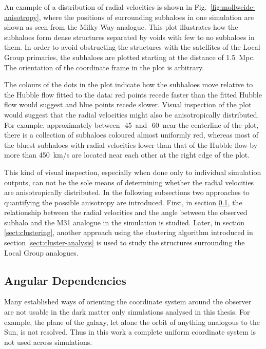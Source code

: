 \documentclass[english, oneside]{HYgradu}
\begin{document}
An example of a distribution of radial velocities is shown in Fig.~\ref{fig:mollweide-anisotropy}, where the positions of surrounding subhaloes in one simulation are shown as seen from the Milky Way analogue. This plot illustrates how the subhaloes form dense structures separated by voids with few to no subhaloes in them. In order to avoid obstructing the structures with the satellites of the Local Group primaries, the subhaloes are plotted starting at the distance of 1.5~Mpc. The orientation of the coordinate frame in the plot is arbitrary.

The colours of the dots in the plot indicate how the subhaloes move relative to the Hubble flow fitted to the data: red points recede faster than the fitted Hubble flow would suggest and blue points recede slower. Visual inspection of the plot would suggest that the radial velocities might also be anisotropically distributed. For example, approximately between -45\textdegree\ and -60\textdegree\, near the centerline of the plot, there is a collection of subhaloes coloured almost uniformly red, whereas most of the bluest subhaloes with radial velocities lower than that of the Hubble flow by more than 450~km/s are located near each other at the right edge of the plot.

This kind of visual inspection, especially when done only to individual simulation outputs, can not be the sole means of determining whether the radial velocities are anisotropically distributed. In the following subsections two approaches to quantifying the possible anisotropy are introduced. First, in section \ref{sect:angular-dependencies}, the relationship between the radial velocities and the angle between the observed subhalo and the M31 analogue in the simulation is studied. Later, in section \ref{sect:clustering}, another approach using the clustering algorithm introduced in section \ref{sect:cluster-analysis} is used to study the structures surrounding the Local Group analogues.

\subsection{Angular Dependencies}\label{sect:angular-dependencies}
Many established ways of orienting the coordinate system around the observer are not usable in the dark matter only simulations analysed in this thesis. For example, the plane of the galaxy, let alone the orbit of anything analogous to the Sun, is not resolved. Thus in this work a complete uniform coordinate system is not used across simulations.
\end{document}
